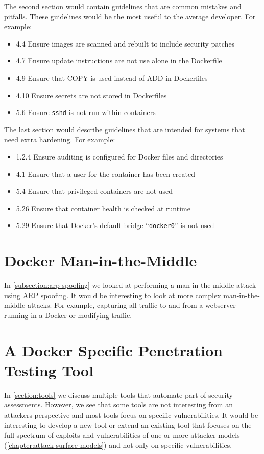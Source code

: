 \medskip

The second section would contain guidelines that are common mistakes and pitfalls. These guidelines would be the most useful to the average developer. For example:
\begin{itemize}
    \item 4.4 Ensure images are scanned and rebuilt to include security patches
    \item 4.7 Ensure update instructions are not use alone in the Dockerfile
    \item 4.9 Ensure that COPY is used instead of ADD in Dockerfiles
    \item 4.10 Ensure secrets are not stored in Dockerfiles
    \item 5.6 Ensure \lstinline{sshd} is not run within containers
\end{itemize}

\medskip

The last section would describe guidelines that are intended for systems that need extra hardening. For example:
\begin{itemize}
    \item 1.2.4 Ensure auditing is configured for Docker files and directories
    \item 4.1 Ensure that a user for the container has been created
    \item 5.4 Ensure that privileged containers are not used
    \item 5.26 Ensure that container health is checked at runtime
    \item 5.29 Ensure that Docker's default bridge ``\lstinline{docker0}'' is not used
\end{itemize}

\section{Docker Man-in-the-Middle}
In \autoref{subsection:arp-spoofing} we looked at performing a man-in-the-middle attack using ARP spoofing. It would be interesting to look at more complex man-in-the-middle attacks. For example, capturing all traffic to and from a webserver running in a Docker or modifying traffic.

\section{A Docker Specific Penetration Testing Tool}
In \autoref{section:tools} we discuss multiple tools that automate part of security assessments. However, we see that some tools are not interesting from an attackers perspective and most tools focus on specific vulnerabilities. It would be interesting to develop a new tool or extend an existing tool that focuses on the full spectrum of exploits and vulnerabilities of one or more attacker models (\autoref{chapter:attack-surface-models}) and not only on specific vulnerabilities.
